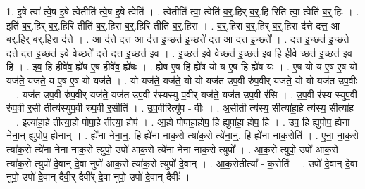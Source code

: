 \documentclass[17pt]{extarticle}
\begin{document}
1. इ॒षे त्वा᳚ त्वे॒ष इ॒षे त्वेतीति॑ त्वे॒ष इ॒षे त्वेति॑ । . त्वेतीति॑ त्वा॒ त्वेति॑ ब॒र्॒.हिर् ब॒र्॒.हि रिति॑ त्वा॒ त्वेति॑ ब॒र्॒.हिः । . इति॑ ब॒र्॒.हिर् ब॒र्॒.हिरि तीति॑ ब॒र्॒.हिरा ब॒र्॒.हिरि तीति॑ ब॒र्॒.हिरा । . ब॒र्॒.हिरा ब॒र्॒.हिर् ब॒र्॒.हिरा द॑त्ते दत्त॒ आ ब॒र्॒.हिर् ब॒र्॒.हिरा द॑त्ते । . आ द॑त्ते दत्त॒ आ द॑त्त इ॒च्छत॑ इ॒च्छते॑ दत्त॒ आ द॑त्त इ॒च्छते᳚ । . द॒त्त॒ इ॒च्छत॑ इ॒च्छते॑ दत्ते दत्त इ॒च्छत॑ इवे वे॒च्छते॑ दत्ते दत्त इ॒च्छत॑ इव । . इ॒च्छत॑ इवे वे॒च्छत॑ इ॒च्छत॑ इव॒ हि हीवे॒ च्छत॑ इ॒च्छत॑ इव॒ हि । . इ॒व॒ हि हीवे॑व॒ ह्ये॑ष ए॒ष हीवे॑व॒ ह्ये॑षः । . ह्ये॑ष ए॒ष हि ह्ये॑ष यो य ए॒ष हि ह्ये॑ष यः । . ए॒ष यो य ए॒ष ए॒ष यो यज॑ते॒ यज॑ते॒ य ए॒ष ए॒ष यो यज॑ते । . यो यज॑ते॒ यज॑ते॒ यो यो यज॑त उप॒वी रु॑प॒वीर् यज॑ते॒ यो यो यज॑त उप॒वीः । . यज॑त उप॒वी रु॑प॒वीर् यज॑ते॒ यज॑त उप॒वी र॑स्यस्यु प॒वीर् यज॑ते॒ यज॑त उप॒वी र॑सि । . उ॒प॒वी र॑स्य स्युप॒वी रु॑प॒वी र॒सी तीत्य॑स्युप॒वी रु॑प॒वी र॒सीति॑ । . उ॒प॒वीरित्यु॑प - वीः । . अ॒सीती त्य॑स्य॒ सीत्या॑हा॒हे त्य॑स्य॒ सीत्या॑ह । . इत्या॑हा॒हे तीत्या॒हो पोपा॒हे तीत्या॒ होप॑ । . आ॒हो पोपा॑हा॒होप॒ हि ह्युपा॑हा॒ होप॒ हि । . उप॒ हि ह्युपोप॒ ह्ये॑ना नेना॒न् ह्युपोप॒ ह्ये॑नान् । . ह्ये॑ना नेना॒न्॒. हि ह्ये॑ना नाक॒रो त्या॑क॒रो त्ये॑ना॒न्॒. हि ह्ये॑ना नाक॒रोति॑ । . ए॒ना॒ ना॒क॒रो त्या॑क॒रो त्ये॑ना नेना नाक॒रो त्युपो॒ उपो॑ आक॒रो त्ये॑ना नेना नाक॒रो त्युपो᳚ । . आ॒क॒रो त्युपो॒ उपो॑ आक॒रो त्या॑क॒रो त्युपो॑ दे॒वान् दे॒वा नुपो॑ आक॒रो त्या॑क॒रो त्युपो॑ दे॒वान् । . आ॒क॒रोतीत्या᳚ - क॒रोति॑ । . उपो॑ दे॒वान् दे॒वा नुपो॒ उपो॑ दे॒वान् दैवी॒र् दैवी᳚र् दे॒वा नुपो॒ उपो॑ दे॒वान् दैवीः᳚ । \newline
\end{document}
